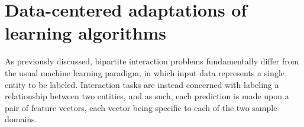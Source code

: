 





\section{Data-centered adaptations of learning algorithms}
\label{sec:standard adaptations}

As previously discussed,
bipartite interaction problems fundamentally differ from the usual machine learning paradigm, in which input data represents a single entity to be labeled. Interaction tasks are instead concerned with labeling a relationship between two entities, and as such, each prediction is made upon a pair of feature vectors, each vector being specific to each of the two sample domains.

